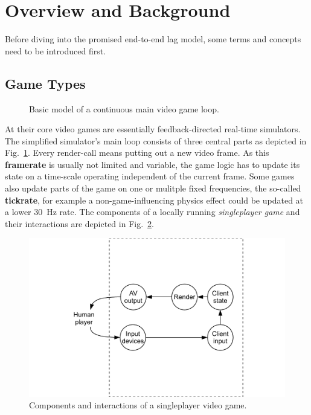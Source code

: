 \section{Overview and Background}
\label{sec:background}

Before diving into the promised end-to-end lag model, some terms and concepts need to be introduced first.


\subsection{Game Types}

\begin{figure}[!t]
\centering
\removelatexerror
\begin{algorithm}[H]
\end{algorithm}
\caption{Basic model of a continuous main video game loop.}
\label{alg:gameloop1}
\end{figure}

At their core video games are essentially feedback-directed real-time simulators. The simplified simulator's main loop consists of three central parts as depicted in Fig.~\ref{alg:gameloop1}. Every render-call means putting out a new video frame. As this \textbf{framerate} is usually not limited and variable, the game logic has to update its state on a time-scale operating independent of the current frame. Some games also update parts of the game on one or mulitple fixed frequencies, the so-called \textbf{tickrate}, for example a non-game-influencing physics effect could be updated at a lower \SI{30}{\hertz} rate. The components of a locally running \textit{singleplayer game} and their interactions are depicted in Fig.~\ref{fig:component-model-local}.

\begin{figure}
  \centering
  \includegraphics[width=0.8\columnwidth]{../models/component_interaction-local.pdf}
  \caption{Components and interactions of a singleplayer video game.}
  \label{fig:component-model-local}
\end{figure}

